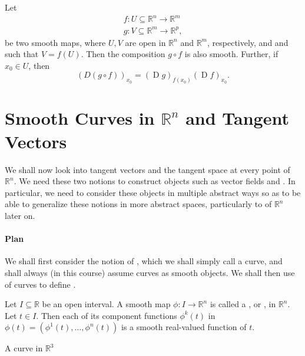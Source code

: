 \documentclass[notoc,notitlepage]{tufte-book}
\DeclareMathOperator{\D}{D}
\begin{document}
\begin{thm}\label{thm:the_chain_rule}
  Let
  \begin{gather*}
    f : U \subseteq \mathbb{R}^n \to \mathbb{R}^m \\
    g : V \subseteq \mathbb{R}^m \to \mathbb{R}^p,
  \end{gather*}
  be two smooth maps, where $U, V$ are open in $\mathbb{R}^n$ and $\mathbb{R}^m$,
  respectively, and and such that $V = f(U)$. Then the composition $g \circ f$ is
  also smooth. Further, if $x_0 \in U$, then
  \begin{equation}\label{eq:the_chain_rule}
    (D (g \circ f))_{x_0} = (\D g)_{f(x_0)} (\D f)_{x_0}.
  \end{equation}
\end{thm}


\section{Smooth Curves in \texorpdfstring{$\mathbb{R}^n$}{Rn} and Tangent Vectors}%
\label{sec:smooth_curves_in_r_n_and_tangent_vectors}

We shall now look into tangent vectors and the tangent space at every point of
$\mathbb{R}^n$. We need these two notions to construct objects such as vector
fields and . In particular, we need to consider these
objects in multiple abstract ways so as to be able to generalize these notions in
more abstract spaces, particularly to  of $\mathbb{R}^n$
later on.

\paragraph{Plan} We shall first consider the notion of ,
which we shall simply call a curve, and shall always (in this course) assume
curves as smooth objects. We shall then use  of curves to
define .

\begin{defn}\label{defn:smooth_curve}
  Let $I \subseteq \mathbb{R}$ be an open interval. A smooth map
  $\phi : I \to \mathbb{R}^n$ is called a , or ,
  in $\mathbb{R}^n$. Let $t \in I$. Then each of its component functions
  $\phi^k(t)$ in $\phi(t) = (\phi^1(t), \ldots, \phi^n(t))$ is a smooth
  real-valued function of $t$.
\end{defn}
\begin{marginfigure}
  \centering
  \caption{A curve in $\mathbb{R}^3$}\label{fig:a_curve_in_r_3_}
\end{marginfigure}
\end{document}
